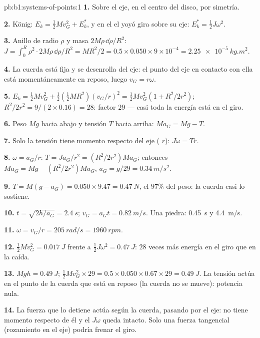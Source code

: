 \begin{solution}{pb:b1:systems-of-points:1}
\textbf{1.} Sobre el eje, en el centro del disco, por simetría.

\textbf{2.} König: $E_k = \tfrac12 Mv_G^2 + E_k^*$, y en el  el yoyó gira sobre su eje: $E_k^* = \tfrac12 J\omega^2$.

\textbf{3.} Anillo de radio $\rho$ y masa $2M\rho\,\dd\rho/R^2$: $J = \int_0^R
\rho^2\cdot 2M\rho\,\dd\rho/R^2 = MR^2/2 = 0.5 \times 0.050 \times 9\times10^{-4}
= \qty{2.25e-5}{kg.m^2}$.

\textbf{4.} La cuerda está fija y se desenrolla del eje: el punto del eje
en contacto con ella está momentáneamente en reposo, luego $v_G = r\omega$.

\textbf{5.} $E_k = \tfrac12 Mv_G^2 + \tfrac12(\tfrac12 MR^2)(v_G/r)^2 = \tfrac12
Mv_G^2(1 + R^2/2r^2)$; $R^2/2r^2 = 9/(2 \times 0.16) = 28$: factor $29$ ---
casi toda la energía está en el giro.

\textbf{6.} Peso $Mg$ hacia abajo y tensión $T$ hacia arriba: $Ma_G = Mg - T$.

\textbf{7.} Solo la tensión tiene momento respecto del eje ( $r$): $J\dot\omega = Tr$.

\textbf{8.} $\dot\omega = a_G/r$: $T = Ja_G/r^2 = (R^2/2r^2)Ma_G$; entonces
$Ma_G = Mg - (R^2/2r^2)Ma_G$, $a_G = g/29 = \qty{0.34}{m/s^2}$.

\textbf{9.} $T = M(g - a_G) = 0.050 \times 9.47 = \qty{0.47}{N}$, el $97\%$
del peso: la cuerda casi lo sostiene.

\textbf{10.} $t = \sqrt{2h/a_G} = \qty{2.4}{s}$; $v_G = a_Gt = \qty{0.82}{m/s}$.
Una piedra: \qty{0.45}{s} y \qty{4.4}{m/s}.

\textbf{11.} $\omega = v_G/r = \qty{205}{rad/s} = \qty{1960}{rpm}$.

\textbf{12.} $\tfrac12 Mv_G^2 = \qty{0.017}{J}$ frente a $\tfrac12 J\omega^2 =
\qty{0.47}{J}$: $28$ veces más energía en el giro que en la caída.

\textbf{13.} $Mgh = \qty{0.49}{J}$; $\tfrac12 Mv_G^2 \times 29 = 0.5 \times 0.050
\times 0.67 \times 29 = \qty{0.49}{J}$. La tensión actúa en el punto de la
cuerda que está en reposo (la cuerda no se mueve): potencia nula.

\textbf{14.} La fuerza que lo detiene actúa según la cuerda, pasando por
el eje: no tiene momento respecto de él y el  $J\omega$ queda
intacto. Solo una fuerza tangencial (rozamiento en el eje) podría frenar
el giro.


\end{solution}
